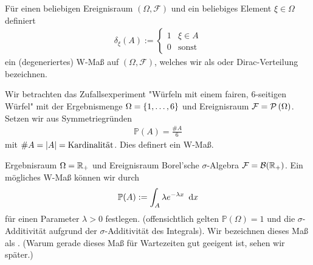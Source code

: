 \begin{beispiel}
    Für einen beliebigen Ereignisraum $(\Omega, \mathcal{F})$ und ein beliebiges Element $\xi \in \Omega$ definiert
    \begin{align*}
        \delta_\xi(A) := \begin{cases} 1 & \xi \in A \\ 0 & \text{sonst} \end{cases}
    \end{align*}
    ein (degeneriertes) W-Maß auf $(\Omega, \mathcal{F})$, welches wir als  oder Dirac-Verteilung bezeichnen.
\end{beispiel}

\begin{beispiel}
    Wir betrachten das Zufallsexperiment "Würfeln mit einem fairen, 6-seitigen Würfel" mit der Ergebnismenge $\Omega = \left\{ 1, \dots, 6 \right\}$ und Ereignisraum $\mathcal{F} = \mathcal{P}\left( \Omega \right)$. Setzen wir aus Symmetriegründen
    \begin{align*}
        \mathbb{P}(A) = \frac{\# A}{6}
    \end{align*}
    mit $\# A = \left| A \right| = \text{Kardinalität}$. Dies definert ein W-Maß.
\end{beispiel}

\begin{beispiel} \label{beispiel: 1_1.7_exponentialverteilung}
    Ergebnisraum $\Omega = \mathbb{R}_+$ und Ereignisraum Borel'sche $\sigma$-Algebra $\mathcal{F} = \mathcal{B}(\mathbb{R}_+)$. Ein mögliches W-Maß können wir durch
    \begin{align*}
        \mathbb{P}(A) \mathrel{:=} \int_A \lambda e^{-\lambda x} \enskip \mathrm{d}x
    \end{align*}
    für einen Parameter $\lambda > 0$ festlegen. (offensichtlich gelten $\mathbb{P}(\Omega) = 1$ und die $\sigma$-Additivität aufgrund der $\sigma$-Additivität des Integrals). Wir bezeichnen dieses Maß als . (Warum gerade dieses Maß für Wartezeiten gut geeigent ist, sehen wir später.)
\end{beispiel}


